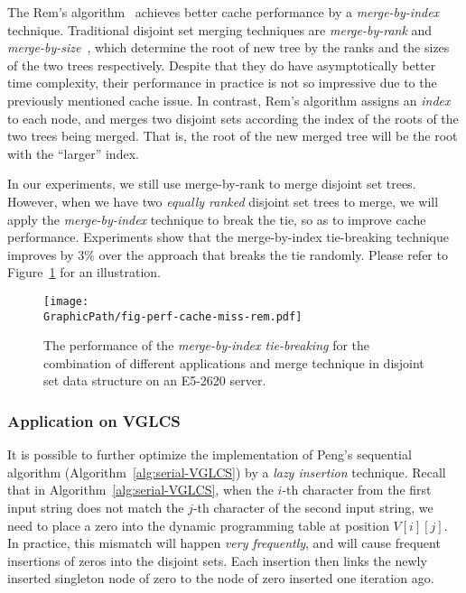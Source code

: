 The Rem's algorithm~\cite{dijkstra1976a} achieves better cache
performance by a {\em merge-by-index} technique.  Traditional disjoint
set merging techniques are {\em merge-by-rank} and {\em
merge-by-size}~\cite{Tarjan1975EfficiencyOA}, which determine the root
of new tree by the ranks and the sizes of the two trees respectively.
Despite that they do have asymptotically better time complexity, their
performance in practice is not so impressive due to the previously
mentioned cache issue.  In contrast, Rem's algorithm assigns an {\em
index} to each node, and merges two disjoint sets according the index of
the roots of the two trees being merged.  That is, the root of the new
merged tree will be the root with the ``larger'' index.

In our experiments, we still use merge-by-rank to merge disjoint set
trees.  However, when we have two {\em equally ranked} disjoint set
trees to merge, we will apply the {\em merge-by-index} technique to
break the tie, so as to improve cache performance.  Experiments show
that the merge-by-index tie-breaking technique improves by 3\% over the
approach that breaks the tie randomly.  Please refer to
Figure~\ref{fig:fig-perf-cache-miss-rem} for an illustration.

\begin{figure}[!thb]
  \centering
  \texttt{[image: \\GraphicPath/fig-perf-cache-miss-rem.pdf]}
  \caption{The performance of the {\em merge-by-index tie-breaking} for
  the combination of different applications and merge technique in
  disjoint set data structure on an E5-2620 server.}
  \label{fig:fig-perf-cache-miss-rem}
\end{figure}

\subsubsection{Application on VGLCS}


It is possible to further optimize the implementation of Peng's
sequential algorithm (Algorithm~\ref{alg:serial-VGLCS}) by a {\em lazy
insertion} technique.  Recall that in Algorithm~\ref{alg:serial-VGLCS},
when the $i$-th character from the first input string does not match the
$j$-th character of the second input string, we need to place a zero
into the dynamic programming table at position $V[i][j]$.  In practice,
this mismatch will happen {\em very frequently}, and will cause frequent
insertions of zeros into the disjoint sets.  Each insertion then links
the newly inserted singleton node of zero to the node of zero inserted
one iteration ago.

